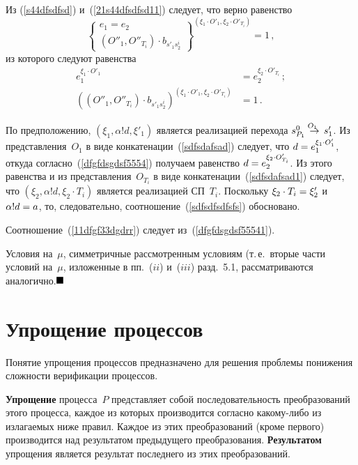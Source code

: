 \begin{multicols}{2}
Из (\ref{s44dfsdfsd}) и~(\ref{21s44dfsdfsd11}) следует, что верно равенство
$$
\left\{
\begin{array}{c}
e_1=e_2\\[3pt]
\left(O''_1,O''_{T_i}\right)\cdot b_{s'_1s^{i}_2}
\end{array}
\right\}^{(\xi_1\cdot O'_1,\xi_2\cdot O'_{T_i})} = 1\,,
$$
из которого следуют равенства
\begin{align}
\label{dfgfdsgdsf5554}
e_1^{\xi_1\cdot O'_1}&=e_2^{\xi_2\cdot O'_{T_i}}\,;
\\
\label{dfgfdsgdsf55541}
\left(\left(O''_1, O''_{T_i}\right)\cdot b_{s'_1s^{i}_2}\right)^{(\xi_1\cdot O'_1,\xi_2\cdot O'_{T_i})}
&= 1\,.
\end{align}

По предположению, $(\xi_1, \alpha!d, \xi'_1)$ является
реализацией  перехода $s_{P_1}^0\;\mathop{\to}\limits^{\!\!\!O_1}\;s'_1$.
Из представления~$O_1$  в виде конкатенации~(\ref{sdfsdafsad}) следует, что
$d\hm=e_1^{\xi_1\cdot O'_1}$, откуда согласно~(\ref{dfgfdsgdsf5554}) получаем равенство
$d\hm=e_2^{\xi_2\cdot O'_{T_i}}$.
Из этого равенства и из представления~$O_{T_i}$  в виде конкатенации~(\ref{sdfsdafsad1})
следует, что $(\xi_2, \alpha!d, \xi_2\cdot T_i)$ является
реализацией  СП~$T_i$.
Поскольку $\xi_2\cdot T_i\hm = \xi'_2$ и $\alpha!d\hm=a$, то, следовательно,
соотношение~(\ref{sdfsdfsdfsfs}) обосновано.

Соотношение~(\ref{11dfgf33dgdrr}) следует из~(\ref{dfgfdsgdsf55541}).

\smallskip


Условия на~$\mu$, симметричные рассмотренным условиям (т.\,е.\ вторые
части условий на~$\mu$, изложенные в пп.~($ii$) и~($iii$)
разд.~5.1, рассматриваются аналогично.\hfill$\blackbox$

\section{Упрощение процессов}

Понятие упрощения процессов предназначено для решения проблемы
понижения сложности верификации процессов.

{\bf Упрощение}
процесса~$P$ представляет собой последовательность
преобразований этого процесса, каждое из которых
производится согласно ка\-ко\-му-ли\-бо из излагаемых ниже правил.
Каждое из этих преобразований (кроме первого) производится над результатом
предыдущего преобразования.
{\bf Результатом} упрощения является результат последнего из
этих преобразований.


\end{multicols}
